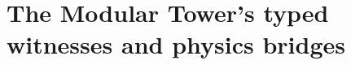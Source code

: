 %

\providecommand{\cA}{\mathcal{A}}
\providecommand{\cB}{\mathcal{B}}
\providecommand{\cH}{\mathcal{H}}
\providecommand{\cM}{\mathcal{M}}
\providecommand{\cW}{\mathcal{W}}
\providecommand{\Walg}{\mathcal{W}}
\providecommand{\fg}{\mathfrak{g}}
\providecommand{\fgrt}{\mathfrak{grt}_1}
\providecommand{\fsl}{\mathfrak{sl}}
\providecommand{\Vir}{\mathrm{Vir}}
\providecommand{\GRT}{\mathrm{GRT}_1}
\providecommand{\Q}{\mathbb{Q}}
\providecommand{\Z}{\mathbb{Z}}
\providecommand{\ChirAlg}{\mathrm{ChirAlg}}
\providecommand{\Einfty}{E_\infty}
\providecommand{\Eone}{E_1}
\providecommand{\Etwo}{E_2}
\providecommand{\Ethree}{E_3}
\providecommand{\MC}{\mathrm{MC}}
\providecommand{\Face}{\mathrm{Face}}
\providecommand{\Phol}{\Phi_{\mathrm{hol}}}
\providecommand{\Zder}{\mathcal{Z}^{\mathrm{der}}_{\mathrm{ch}}}
\providecommand{\Holbd}{\mathsf{Hol}^{\mathrm{bd}}}
\providecommand{\SCchtop}{\mathsf{SC}^{\mathrm{ch,top}}}
\providecommand{\FactAlg}{\mathsf{FactAlg}}
\providecommand{\OC}{\mathrm{OC}}
\providecommand{\VOA}{\mathrm{VOA}}
\providecommand{\DW}{\mathrm{DW}}
\providecommand{\Res}{\operatorname{Res}}
\providecommand{\Mel}{\mathrm{Mel}}
\providecommand{\Sh}{\mathrm{Sh}}

\chapter{The Modular Tower's typed witnesses and physics bridges}
\label{ch:part-iv-platonic-introduction}

